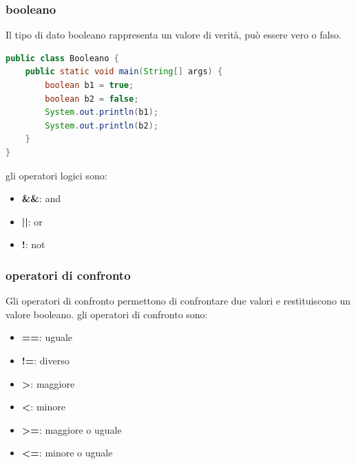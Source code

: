 \documentclass[11pt]{article}
\begin{document}
\subsubsection{booleano}
Il tipo di dato booleano rappresenta un valore di verità, può essere vero o falso.
\begin{lstlisting}[language=Java]
public class Booleano {
    public static void main(String[] args) {
        boolean b1 = true;
        boolean b2 = false;
        System.out.println(b1);
        System.out.println(b2);
    }
}
\end{lstlisting}
gli operatori logici sono:
\begin{itemize}
    \item \textbf{\&\&}: and
    \item \textbf{||}: or
    \item \textbf{!}: not
    \end{itemize}
\subsubsection{operatori di confronto}
Gli operatori di confronto permettono di confrontare due valori e restituiscono un valore booleano.
gli operatori di confronto sono:
\begin{itemize}
    \item \textbf{==}: uguale
    \item \textbf{!=}: diverso
    \item \textbf{>}: maggiore
    \item \textbf{<}: minore
    \item \textbf{>=}: maggiore o uguale
    \item \textbf{<=}: minore o uguale
    \end{itemize}
\end{document}
